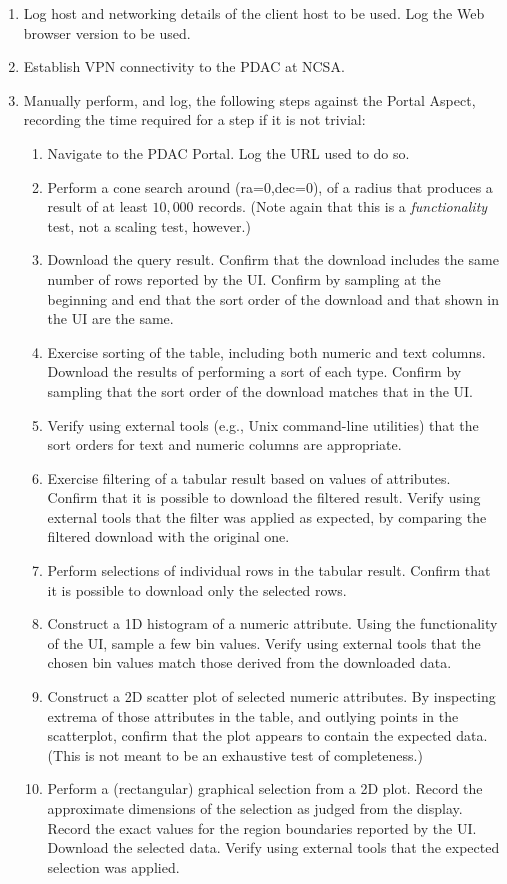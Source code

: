 \begin{enumerate}

  \item{Log host and networking details of the client host to be used.
 Log the Web browser version to be used.}
  \item{Establish VPN connectivity to the PDAC at NCSA.}
  \item{Manually perform, and log, the following steps against the Portal Aspect, recording the time required for a step if it is not trivial:
    \begin{enumerate}
      \item{Navigate to the PDAC Portal.  Log the URL used to do so.}
      \item{Perform a cone search around (ra=0,dec=0), of a radius that produces a result of at least $10,000$ records.
 (Note again that this is a \emph{functionality} test, not a scaling test, however.)}
      \item{Download the query result. 
 Confirm that the download includes the same number of rows reported by the UI.
 Confirm by sampling at the beginning and end that the sort order of the download and that shown in the UI are the same.}
      \item{Exercise sorting of the table, including both numeric and text columns.
 Download the results of performing a sort of each type.
 Confirm by sampling that the sort order of the download matches that in the UI.}
      \item{Verify using external tools (e.g., Unix command-line utilities) that the sort orders for text and numeric columns are appropriate.}
      \item{Exercise filtering of a tabular result based on values of attributes.
 Confirm that it is possible to download the filtered result.
 Verify using external tools that the filter was applied as expected, by comparing the filtered download with the original one.}
      \item{Perform selections of individual rows in the tabular result.
 Confirm that it is possible to download only the selected rows.}
      \item{Construct a 1D histogram of a numeric attribute.
 Using the functionality of the UI, sample a few bin values.
 Verify using external tools that the chosen bin values match those derived from the downloaded data.}
      \item{Construct a 2D scatter plot of selected numeric attributes.
 By inspecting extrema of those attributes in the table, and outlying points in the scatterplot, confirm that the plot appears to contain the expected data.
 (This is not meant to be an exhaustive test of completeness.)}
      \item{Perform a (rectangular) graphical selection from a 2D plot.
 Record the approximate dimensions of the selection as judged from the display.
 Record the exact values for the region boundaries reported by the UI.
 Download the selected data.
 Verify using external tools that the expected selection was applied.}
    \end{enumerate}
  }

\end{enumerate}
